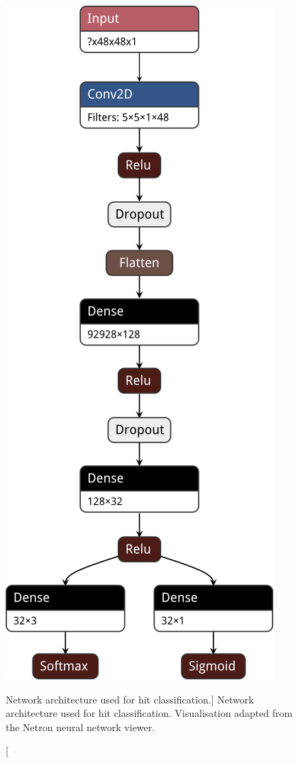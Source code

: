 \begin{figure}
	\centering
	\includegraphics[height=0.7\textheight]{figures/track_shower_arch.png}
	\caption
	[Network architecture used for hit classification.]
	{Network architecture used for hit classification. Visualisation adapted from
	the Netron neural network viewer\cite{netron}.}
	\label{fig:arch}
\end{figure}


